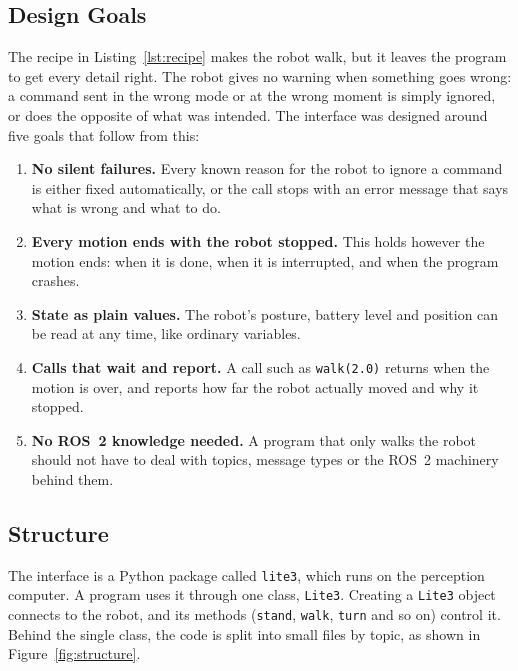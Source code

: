 \subsection{Design Goals}
\label{sec:goals}

The recipe in Listing~\ref{lst:recipe} makes the robot walk, but it leaves the program to get every
detail right. The robot gives no warning when something goes wrong: a command sent in the wrong mode or at
the wrong moment is simply ignored, or does the opposite of what was intended. The interface was designed
around five goals that follow from this:

\begin{enumerate}
  \item \textbf{No silent failures.} Every known reason for the robot to ignore a command is either fixed
    automatically, or the call stops with an error message that says what is wrong and what to do.
  \item \textbf{Every motion ends with the robot stopped.} This holds however the motion ends: when it is
    done, when it is interrupted, and when the program crashes.
  \item \textbf{State as plain values.} The robot's posture, battery level and position can be read at any
    time, like ordinary variables.
  \item \textbf{Calls that wait and report.} A call such as \texttt{walk(2.0)} returns when the motion is
    over, and reports how far the robot actually moved and why it stopped.
  \item \textbf{No ROS~2 knowledge needed.} A program that only walks the robot should not have to deal
    with topics, message types or the ROS~2 machinery behind them.
\end{enumerate}

\subsection{Structure}
\label{sec:structure}

The interface is a Python package called \texttt{lite3}, which runs on the perception computer. A program
uses it through one class, \texttt{Lite3}. Creating a \texttt{Lite3} object connects to the robot, and its
methods (\texttt{stand}, \texttt{walk}, \texttt{turn} and so on) control it. Behind the single class, the
code is split into small files by topic, as shown in Figure~\ref{fig:structure}.

